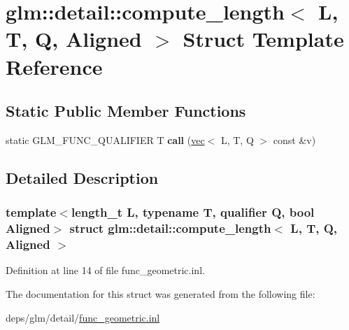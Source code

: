 \hypertarget{structglm_1_1detail_1_1compute__length}{}\section{glm\+:\+:detail\+:\+:compute\+\_\+length$<$ L, T, Q, Aligned $>$ Struct Template Reference}
\label{structglm_1_1detail_1_1compute__length}
\subsection*{Static Public Member Functions}
\begin{DoxyCompactItemize}
\item 
\mbox{\label{structglm_1_1detail_1_1compute__length_a91fe692eca594f06b642810fd4fc1a6e}} 
static G\+L\+M\+\_\+\+F\+U\+N\+C\+\_\+\+Q\+U\+A\+L\+I\+F\+I\+ER T {\bfseries call} (\hyperlink{structglm_1_1vec}{vec}$<$ L, T, Q $>$ const \&v)
\end{DoxyCompactItemize}


\subsection{Detailed Description}
\subsubsection*{template$<$length\+\_\+t L, typename T, qualifier Q, bool Aligned$>$\newline
struct glm\+::detail\+::compute\+\_\+length$<$ L, T, Q, Aligned $>$}



Definition at line 14 of file func\+\_\+geometric.\+inl.



The documentation for this struct was generated from the following file\+:\begin{DoxyCompactItemize}
\item 
deps/glm/detail/\hyperlink{func__geometric_8inl}{func\+\_\+geometric.\+inl}\end{DoxyCompactItemize}
